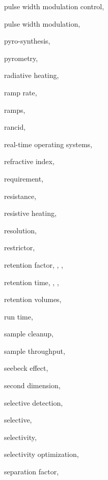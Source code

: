 \begin{theindex}
  \item \lowercase {pulse width modulation control}, 
  \item \lowercase {pulse width modulation}, 
  \item \lowercase {pyro-synthesis}, 
  \item \lowercase {pyrometry}, 
  \item \lowercase {radiative heating}, 
  \item \lowercase {ramp rate}, 
  \item \lowercase {ramps}, 
  \item \lowercase {rancid}, 
  \item \lowercase {real-time operating systems}, 
  \item \lowercase {refractive index}, 
  \item \lowercase {requirement}, 
  \item \lowercase {resistance}, 
  \item \lowercase {resistive heating}, 
  \item \lowercase {resolution}, 
  \item \lowercase {restrictor}, 
  \item \lowercase {retention factor}, , , 
  \item \lowercase {retention time}, , , 
  \item \lowercase {retention volumes}, 
  \item \lowercase {run time}, 
  \item \lowercase {sample cleanup}, 
  \item \lowercase {sample throughput}, 
  \item \lowercase {Seebeck effect}, 
  \item \lowercase {second dimension}, 
  \item \lowercase {selective detection}, 
  \item \lowercase {selective}, 
  \item \lowercase {selectivity}, 
  \item \lowercase {selectivity optimization}, 
  \item \lowercase {separation factor}, 

\end{theindex}
